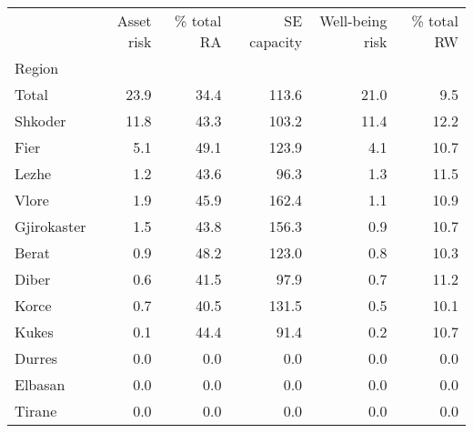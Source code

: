 \begin{tabular}{lrrrrr}
\toprule
{} &  Asset risk &  \% total RA &  SE capacity &  Well-being risk &  \% total RW \\
Region      &             &             &              &                  &             \\
\midrule
Total       &        23.9 &        34.4 &        113.6 &             21.0 &         9.5 \\
Shkoder     &        11.8 &        43.3 &        103.2 &             11.4 &        12.2 \\
Fier        &         5.1 &        49.1 &        123.9 &              4.1 &        10.7 \\
Lezhe       &         1.2 &        43.6 &         96.3 &              1.3 &        11.5 \\
Vlore       &         1.9 &        45.9 &        162.4 &              1.1 &        10.9 \\
Gjirokaster &         1.5 &        43.8 &        156.3 &              0.9 &        10.7 \\
Berat       &         0.9 &        48.2 &        123.0 &              0.8 &        10.3 \\
Diber       &         0.6 &        41.5 &         97.9 &              0.7 &        11.2 \\
Korce       &         0.7 &        40.5 &        131.5 &              0.5 &        10.1 \\
Kukes       &         0.1 &        44.4 &         91.4 &              0.2 &        10.7 \\
Durres      &         0.0 &         0.0 &          0.0 &              0.0 &         0.0 \\
Elbasan     &         0.0 &         0.0 &          0.0 &              0.0 &         0.0 \\
Tirane      &         0.0 &         0.0 &          0.0 &              0.0 &         0.0 \\
\bottomrule
\end{tabular}
